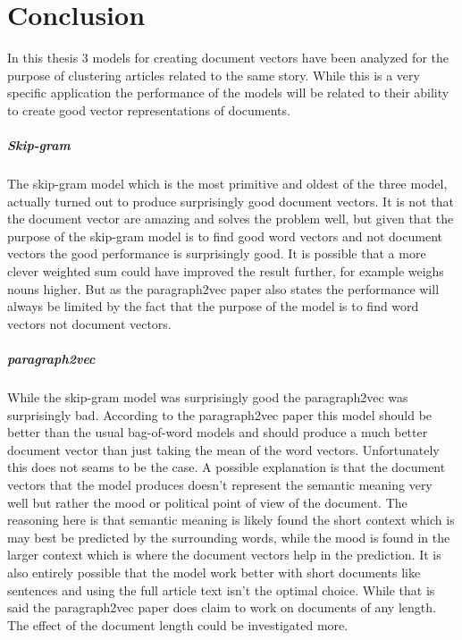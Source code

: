 \chapter{Conclusion}

In this thesis 3 models for creating document vectors have been analyzed for the purpose of clustering articles related to the same story. While this is a very specific application the performance of the models will be related to their ability to create good vector representations of documents.

\paragraph{Skip-gram} The skip-gram model which is the most primitive and oldest of the three model, actually turned out to produce surprisingly good document vectors. It is not that the document vector are amazing and solves the problem well, but given that the purpose of the skip-gram model is to find good word vectors and not document vectors the good performance is surprisingly good. It is possible that a more clever weighted sum could have improved the result further, for example weighs nouns higher. But as the paragraph2vec paper \cite{doc2vec} also states the performance will always be limited by the fact that the purpose of the model is to find word vectors not document vectors.

\paragraph{paragraph2vec} While the skip-gram model was surprisingly good the paragraph2\-vec was surprisingly bad. According to the paragraph2vec paper \cite{doc2vec} this model should be better than the usual bag-of-word models and should produce a much better document vector than just taking the mean of the word vectors. Unfortunately this does not seams to be the case. A possible explanation is that the document vectors that the model produces doesn't represent the semantic meaning very well but rather the mood or political point of view of the document. The reasoning here is that semantic meaning is likely found the short context which is may best be predicted by the surrounding words, while the mood is found in the larger context which is where the document vectors help in the prediction. It is also entirely possible that the model work better with short documents like sentences and using the full article text isn't the optimal choice. While that is said the paragraph2vec paper \cite{doc2vec} does claim to work on documents of any length. The effect of the document length could be investigated more.

